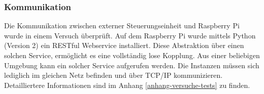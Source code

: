 \subsubsection{Kommunikation}
Die Kommunikation zwischen externer Steuerungseinheit und Raspberry Pi wurde in einem Versuch überprüft. Auf dem Raspberry Pi wurde mittels Python (Version 2) ein RESTful Webservice installiert. Diese Abstraktion über einen solchen Service, ermöglicht es eine vollständig lose Kopplung. Aus einer beliebigen Umgebung kann ein solcher Service aufgerufen werden. Die Instanzen müssen sich lediglich im gleichen Netz befinden und über TCP/IP kommunizieren. Detailliertere Informationen sind im Anhang \ref{anhang-versuche-tests} zu finden.